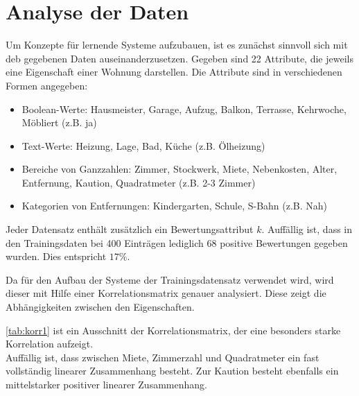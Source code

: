 \section{Analyse der Daten}\label{sec:analyse}
Um Konzepte für lernende Systeme aufzubauen, ist es zunächst sinnvoll sich mit
deb gegebenen Daten auseinanderzusetzen.
Gegeben sind 22 Attribute, die jeweils eine Eigenschaft einer Wohnung darstellen.
Die Attribute sind in verschiedenen Formen angegeben:
\begin{itemize}
    \item Boolean-Werte: Hausmeister, Garage, Aufzug, Balkon, Terrasse, Kehrwoche, Möbliert (z.B. ja)
    \item Text-Werte: Heizung, Lage, Bad, Küche (z.B. Ölheizung)
    \item Bereiche von Ganzzahlen: Zimmer, Stockwerk, Miete, Nebenkosten, Alter, Entfernung, Kaution, Quadratmeter (z.B. 2-3 Zimmer)
    \item Kategorien von Entfernungen: Kindergarten, Schule, S-Bahn (z.B. Nah)
\end{itemize}

Jeder Datensatz enthält zusätzlich ein Bewertungsattribut $k$.
Auffällig ist, dass in den Trainingsdaten bei 400 Einträgen lediglich 68 positive Bewertungen gegeben wurden.
Dies entspricht $17\%$.

Da für den Aufbau der Systeme der Trainingsdatensatz verwendet wird, wird dieser mit Hilfe einer Korrelationsmatrix
genauer analysiert. Diese zeigt die Abhängigkeiten zwischen den Eigenschaften.

\autoref{tab:korr1} ist ein Ausschnitt der Korrelationsmatrix, der eine besonders starke Korrelation aufzeigt. \\
Auffällig ist, dass zwischen Miete, Zimmerzahl und Quadratmeter ein fast vollständig linearer Zusammenhang
besteht. Zur Kaution besteht ebenfalls ein mittelstarker positiver linearer Zusammenhang.

